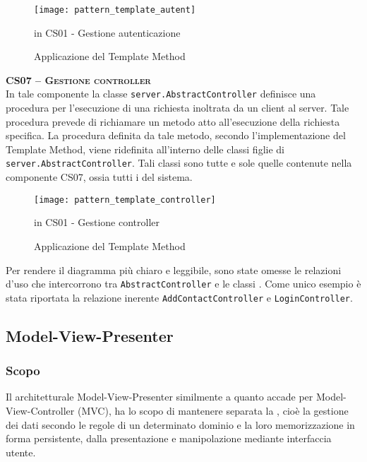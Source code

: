 \begin{description}
\begin{figure}[H]
  \centering
  \texttt{[image: pattern\_template\_autent]}
  \caption{Applicazione del  Template Method}in \textsf{CS01 - Gestione autenticazione} \label{fig:template_autent}
\end{figure}


	\item{\scshape\bfseries CS07 -- Gestione controller}\\
In tale componente la classe \texttt{server.AbstractController} definisce una procedura per l'esecuzione di una richiesta inoltrata da un client al server. Tale procedura prevede di richiamare un metodo atto all'esecuzione della richiesta specifica. La procedura definita da tale metodo, secondo l'implementazione del Template Method, viene ridefinita all'interno delle classi figlie di \texttt{server.AbstractController}. Tali classi sono tutte e sole quelle contenute nella componente CS07, ossia tutti i  del sistema.

\begin{figure}[H]
  \centering
  \texttt{[image: pattern\_template\_controller]}
  \caption{Applicazione del  Template Method}in \textsf{CS01 - Gestione controller} \label{fig:template_controller}
\end{figure}



Per rendere il diagramma più chiaro e leggibile, sono state omesse le relazioni d'uso che intercorrono tra \texttt{AbstractController} e le classi . Come unico esempio è stata riportata la relazione inerente \texttt{AddContactController} e \texttt{LoginController}.

\end{description}

\subsection{Model-View-Presenter}\label{sec:MVP}

\subsubsection{Scopo}
Il  architetturale Model-View-Presenter similmente a quanto accade per Model-View-Controller (MVC), ha lo scopo di mantenere separata la , cioè la gestione dei dati secondo le regole di un determinato dominio e la loro memorizzazione in forma persistente, dalla presentazione e manipolazione mediante interfaccia utente.


